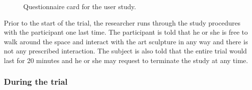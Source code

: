 \begin{figure} [!htbp]
	\centering
	\caption[Questionnaire card for the user study]{Questionnaire card for the user study.}
	\label{fig:Questionaire-Card2}
\end{figure}

Prior to the start of the trial, the researcher runs through the study procedures with the participant one last time. The participant is told that he or she is free to walk around the space and interact with the art sculpture in any way and there is not any prescribed interaction. The subject is also told that the entire trial would last for 20 minutes and he or she may request to terminate the study at any time.


\subsubsection{During the trial}

